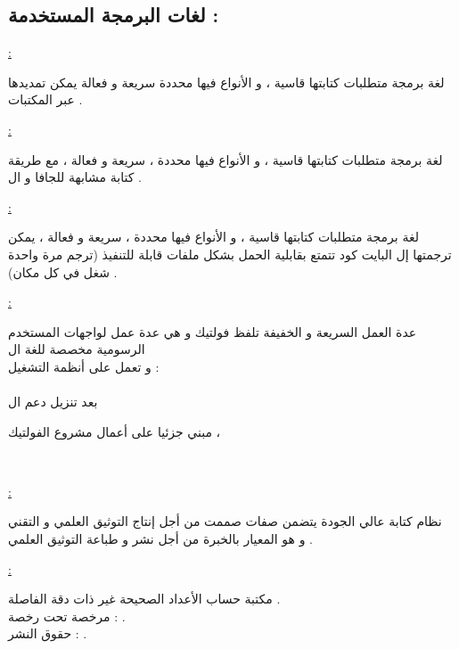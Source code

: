 \documentclass[11pt,a4paper]{report}
\begin{document}
\begin{otherlanguage}{arabic}
\chapter{لغات البرمجة المستخدمة :}
\begin{otherlanguage}{arabic}
\begin{center}
\begin{flushleft}
\underline{\textbf{} :}
\end{flushleft}  لغة برمجة متطلبات كتابتها قاسية ، و الأنواع فيها محددة سريعة و فعالة يمكن تمديدها عبر المكتبات .
\\
\begin{flushleft}
\underline{\textbf{} :}
\end{flushleft} لغة برمجة متطلبات كتابتها قاسية ، و الأنواع فيها محددة  ، سريعة و فعالة ، مع طريقة كتابة مشابهة للجافا و ال  \textit{} . 
\\
\begin{flushleft}
\underline{\textbf{} :}
\end{flushleft}لغة برمجة متطلبات كتابتها قاسية ، و الأنواع فيها محددة  ، سريعة و فعالة ، يمكن ترجمتها إل البايت كود تتمتع بقابلية الحمل بشكل ملفات قابلة للتنفيذ (ترجم مرة واحدة شغل في كل مكان) .
\\
\begin{flushleft}
\underline{\textbf{} :}
\end{flushleft}  عدة العمل السريعة و الخفيفة تلفظ فولتيك و هي عدة عمل لواجهات المستخدم الرسومية مخصصة للغة ال \textit{}
\\
و تعمل على أنظمة التشغيل  :
\\
\textit{} 
\\
بعد تنزيل دعم ال 
\\
\begin{flushleft}
\textbf{} 
 مبني جزئيا على أعمال مشروع الفولتيك ،
\\
\textit{}
\end{flushleft}
\\
\begin{flushleft}
\underline{\textbf{} :}
\end{flushleft}  نظام كتابة عالي الجودة يتضمن صفات صممت من أجل إنتاج التوثيق العلمي و التقني 
\\
 و  \textit{} هو المعيار بالخبرة من أجل نشر و طباعة التوثيق العلمي .
\\
\begin{flushleft}
\underline{\textbf{} :}
\end{flushleft}  مكتبة حساب الأعداد الصحيحة غير ذات دقة الفاصلة .
\\
مرخصة تحت رخصة :
\textit{ } .
\\
حقوق النشر : \textit{} .
\textit{}
\end{center}
\end{otherlanguage}

\end{otherlanguage}
\end{document}
